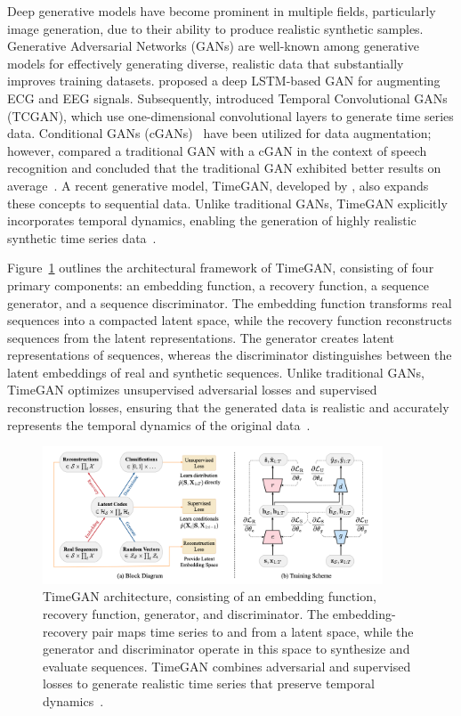 Deep generative models have become prominent in multiple fields, particularly image generation, due to their ability to produce realistic synthetic samples. Generative Adversarial Networks (GANs) are well-known among generative models for effectively generating diverse, realistic data that substantially improves training datasets. \cite{8512396} proposed a deep LSTM-based GAN for augmenting ECG and EEG signals. Subsequently, \cite{ramponi2019tcganconditionalgenerativeadversarial} introduced Temporal Convolutional GANs (TCGAN), which use one-dimensional convolutional layers to generate time series data. Conditional GANs (cGANs)~\cite{mirza2014conditionalgenerativeadversarialnets} have been utilized for data augmentation; however, \cite{9003933} compared a traditional GAN with a cGAN in the context of speech recognition and concluded that the traditional GAN exhibited better results on average~\cite{10.1371/journal.pone.0254841}. A recent generative model, TimeGAN, developed by \cite{timegan}, also expands these concepts to sequential data. Unlike traditional GANs, TimeGAN explicitly incorporates temporal dynamics, enabling the generation of highly realistic synthetic time series data~\cite{timegan}.



Figure~\ref{fig:timegan} outlines the architectural framework of TimeGAN, consisting of four primary components: an embedding function, a recovery function, a sequence generator, and a sequence discriminator. The embedding function transforms real sequences into a compacted latent space, while the recovery function reconstructs sequences from the latent representations. The generator creates latent representations of sequences, whereas the discriminator distinguishes between the latent embeddings of real and synthetic sequences. Unlike traditional GANs, TimeGAN optimizes unsupervised adversarial losses and supervised reconstruction losses, ensuring that the generated data is realistic and accurately represents the temporal dynamics of the original data~\cite{timegan}. 

\begin{figure}[h!]
    \centering
    \includegraphics[page=1, width=0.9\textwidth]{./images/timegan.png}
\caption{TimeGAN architecture, consisting of an embedding function, recovery function, generator, and discriminator. The embedding-recovery pair maps time series to and from a latent space, while the generator and discriminator operate in this space to synthesize and evaluate sequences. TimeGAN combines adversarial and supervised losses to generate realistic time series that preserve temporal dynamics~\cite{timegan}.}

    \label{fig:timegan}
\end{figure}


